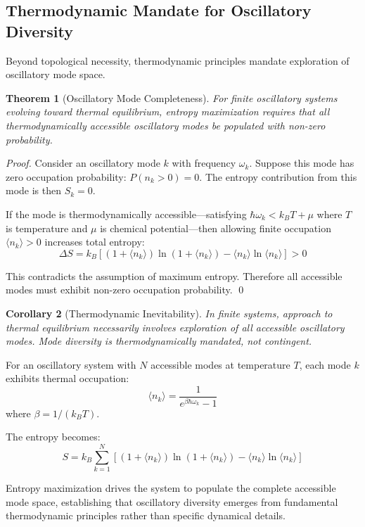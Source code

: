 \documentclass[11pt]{article}
\newtheorem{theorem}{Theorem}[section]
\newtheorem{corollary}[theorem]{Corollary}
\theoremstyle{remark}
\begin{document}
\subsection{Thermodynamic Mandate for Oscillatory Diversity}

Beyond topological necessity, thermodynamic principles mandate exploration of oscillatory mode space.

\begin{theorem}[Oscillatory Mode Completeness]
\label{thm:mode_completeness}
For finite oscillatory systems evolving toward thermal equilibrium, entropy maximization requires that all thermodynamically accessible oscillatory modes be populated with non-zero probability.
\end{theorem}

\begin{proof}
Consider an oscillatory mode $k$ with frequency $\omega_k$. Suppose this mode has zero occupation probability: $P(n_k > 0) = 0$. The entropy contribution from this mode is then $S_k = 0$.

If the mode is thermodynamically accessible—satisfying $\hbar\omega_k < k_B T + \mu$ where $T$ is temperature and $\mu$ is chemical potential—then allowing finite occupation $\langle n_k\rangle > 0$ increases total entropy:
$$\Delta S = k_B[(1 + \langle n_k\rangle)\ln(1 + \langle n_k\rangle) - \langle n_k\rangle\ln\langle n_k\rangle] > 0$$

This contradicts the assumption of maximum entropy. Therefore all accessible modes must exhibit non-zero occupation probability. \qed
\end{proof}

\begin{corollary}[Thermodynamic Inevitability]
In finite systems, approach to thermal equilibrium necessarily involves exploration of all accessible oscillatory modes. Mode diversity is thermodynamically mandated, not contingent.
\end{corollary}

For an oscillatory system with $N$ accessible modes at temperature $T$, each mode $k$ exhibits thermal occupation:
$$\langle n_k\rangle = \frac{1}{e^{\beta\hbar\omega_k} - 1}$$
where $\beta = 1/(k_B T)$.

The entropy becomes:
$$S = k_B \sum_{k=1}^{N} \left[(1 + \langle n_k\rangle)\ln(1 + \langle n_k\rangle) - \langle n_k\rangle\ln\langle n_k\rangle\right]$$

Entropy maximization drives the system to populate the complete accessible mode space, establishing that oscillatory diversity emerges from fundamental thermodynamic principles rather than specific dynamical details.
\end{document}
